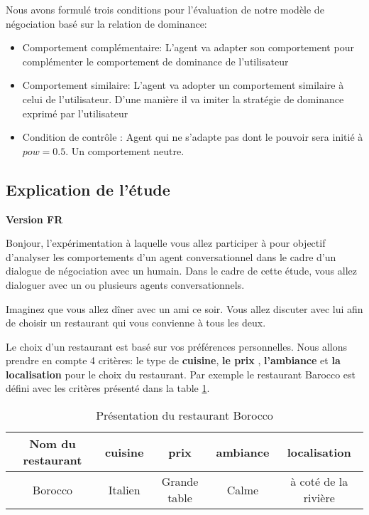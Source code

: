 \documentclass [french]{paper}
\begin{document}
	Nous avons formulé trois conditions pour l'évaluation de notre modèle de négociation basé sur la relation de dominance: 
	\begin{itemize}
		\item Comportement complémentaire: L'agent va adapter son comportement pour complémenter le comportement de dominance de l'utilisateur
		
		\item Comportement similaire: L'agent va adopter un comportement similaire à celui de l'utilisateur. D'une manière il va imiter la stratégie de dominance exprimé par l'utilisateur
		
		\item Condition de contrôle : Agent qui ne s'adapte pas dont le pouvoir sera initié à $pow =0.5$. Un comportement neutre. 
		\end{itemize}
		
		
			\subsection{Explication de l'étude}
			\textbf{ Version FR}
			
			Bonjour, l’expérimentation à laquelle vous allez participer à pour objectif d'analyser les comportements d’un agent conversationnel dans le cadre d’un dialogue de négociation avec un humain.
			Dans le cadre de cette étude, vous allez dialoguer avec un ou plusieurs agents conversationnels.
			
			Imaginez que vous allez dîner avec un ami ce soir. Vous allez discuter avec lui afin de choisir un restaurant qui vous convienne à tous les deux.
			
			Le choix d'un restaurant est basé sur vos préférences personnelles. Nous allons prendre en compte 4 critères: le type de \textbf{cuisine}, \textbf{le prix} , \textbf{l'ambiance} et \textbf{la localisation} pour le choix du restaurant. Par exemple le restaurant Barocco est défini avec les critères présenté dans la table \ref{teb:exfr}.
			\begin{table}[h]
				\begin{tabular} {|c|c|c|c|c|}
					\hline
					Nom du restaurant & cuisine & prix & ambiance& localisation \\
					\hline
					Borocco & Italien & Grande table & Calme & à coté de la rivière \\
					\hline 
				\end{tabular}
				\label{teb:exfr}
				\caption{Présentation du restaurant Borocco}
			\end{table}
			
\end{document}
